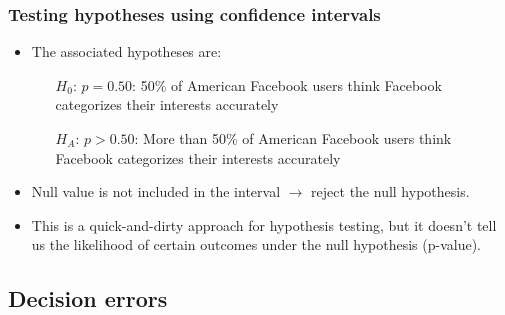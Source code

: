  
\begin{frame}
\frametitle{Testing hypotheses using confidence intervals}
 
{\small {}}
 
\pause
 
\begin{itemize}
 
\item The associated hypotheses are:
\begin{itemize}
\item[$H_0$:] $p = 0.50$: 50\% of American Facebook users think Facebook categorizes their interests accurately
\item[$H_A$:] $p > 0.50$: More than 50\% of American Facebook users think Facebook categorizes their interests accurately
\end{itemize}
 
\pause
 
\item Null value is not included in the interval $\rightarrow$ reject the null hypothesis.
 
\pause
 
\item This is a quick-and-dirty approach for hypothesis testing, but it doesn't tell us the likelihood of certain outcomes under the null hypothesis (p-value).
 
\end{itemize}
 
\end{frame}
 

\subsection{Decision errors}


